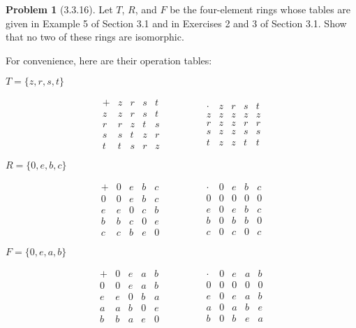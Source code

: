 \documentclass[12pt]{article}
\theoremstyle{definition}
\newtheorem*{prob}{Problem}
\begin{document}
\begin{prob}[3.3.16]
Let $T$, $R$, and $F$ be the four-element rings whose tables are given in Example 5 of  
Section 3.1 and in Exercises 2 and 3 of  Section 3.1. 
Show that no two of  these rings are isomorphic.

For convenience, here are their operation tables:

$T = \{z,r,s,t \}$

\[
\begin{array}{c|cccc}
+ & z & r & s & t \\
\hline
z      & z & r & s & t  \\
r      & r & z & t & s  \\
s      & s & t & z & r  \\
t      & t & s & r & z 
\end{array}
\qquad\qquad
\begin{array}{c|cccc}
\cdot & z & r & s & t \\
\hline
z      & z & z & z & z  \\
r      & z & z & r & r  \\
s      & z & z & s & s  \\
t      & z & z & t & t 
\end{array}
\]

$R = \{ 0, e, b, c \}$

\[
\begin{array}{c|cccc}
+ & 0 & e & b & c \\
\hline
0      & 0 & e & b & c  \\
e      & e & 0 & c & b  \\
b      & b & c & 0 & e  \\
c      & c & b & e & 0 
\end{array}
\qquad\qquad
\begin{array}{c|cccc}
\cdot & 0 & e & b & c \\
\hline
0      & 0 & 0 & 0 & 0  \\
e      & 0 & e & b & c  \\
b      & 0 & b & b & 0  \\
c      & 0 & c & 0 & c 
\end{array}
\]

$F = \{ 0, e, a, b \}$

\[
\begin{array}{c|cccc}
+ & 0 & e & a & b \\
\hline
0      & 0 & e & a & b  \\
e      & e & 0 & b & a  \\
a      & a & b & 0 & e  \\
b      & b & a & e & 0 
\end{array}
\qquad\qquad
\begin{array}{c|cccc}
\cdot & 0 & e & a & b \\
\hline
0      & 0 & 0 & 0 & 0  \\
e      & 0 & e & a & b  \\
a      & 0 & a & b & e  \\
b      & 0 & b & e & a 
\end{array}
\]
\end{prob}
\end{document}
